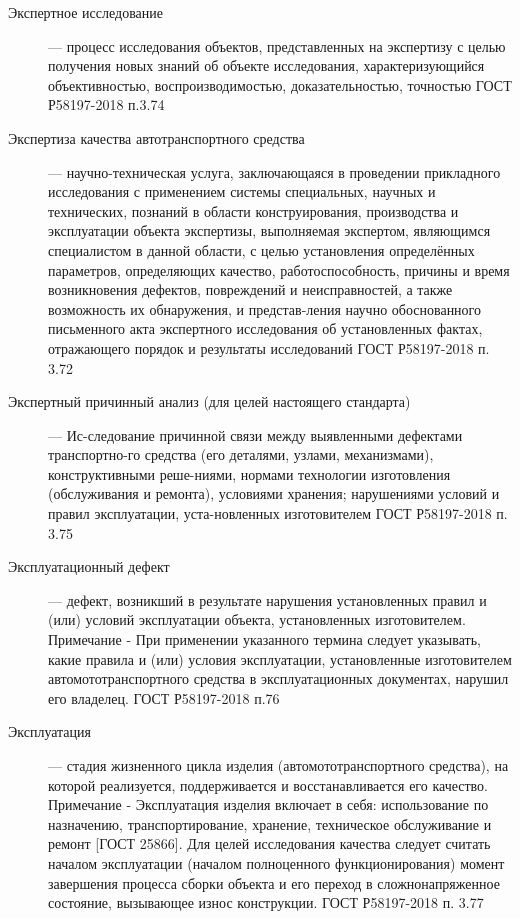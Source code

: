 \begin{description}
	\item[Экспертное исследование] --- процесс исследования объектов, представленных на экспертизу с целью получения новых знаний об объекте исследования, характеризующийся объективностью, воспроизводимостью, доказательностью, точностью ГОСТ Р58197-2018 п.3.74


\item[Экспертиза качества автотранспортного средства] --- научно-техническая услуга, заключающаяся в проведении прикладного исследования с применением системы специальных, научных и технических, познаний в области конструирования, производства и эксплуатации объекта экспертизы, выполняемая экспертом, являющимся специалистом в данной области, с целью установления определённых параметров, определяющих качество, работоспособность, причины и время возникновения дефектов, повреждений и неисправностей, а также возможность их обнаружения, и представ-ления научно обоснованного письменного акта экспертного исследования об установленных фактах, отражающего порядок и результаты исследований ГОСТ Р58197-2018 п. 3.72


\item[Экспертный причинный анализ (для целей настоящего стандарта)] --- Ис-следование причинной связи между выявленными дефектами транспортно-го средства (его деталями, узлами, механизмами), конструктивными реше-ниями, нормами технологии изготовления (обслуживания и ремонта), условиями хранения; нарушениями условий и правил эксплуатации, уста-новленных изготовителем ГОСТ Р58197-2018 п. 3.75

\item[Эксплуатационный дефект] --- дефект, возникший в результате нарушения установленных правил и (или) условий эксплуатации объекта, установленных изготовителем. Примечание - При применении указанного термина следует указывать, какие правила и (или) условия эксплуатации, установленные изготовителем автомототранспортного средства в эксплуатационных документах, нарушил его владелец. ГОСТ Р58197-2018 п.76

\item[Эксплуатация] --- стадия жизненного цикла изделия (автомототранспортного средства), на которой реализуется, поддерживается и восстанавливается его качество. Примечание - Эксплуатация изделия включает в себя: использование по назначению, транспортирование, хранение, техническое обслуживание и ремонт [ГОСТ 25866]. Для целей исследования качества следует считать началом эксплуатации (началом полноценного функционирования) момент завершения процесса сборки объекта и его переход в сложнонапряженное состояние, вызывающее износ конструкции. ГОСТ Р58197-2018 п. 3.77


\end{description}
